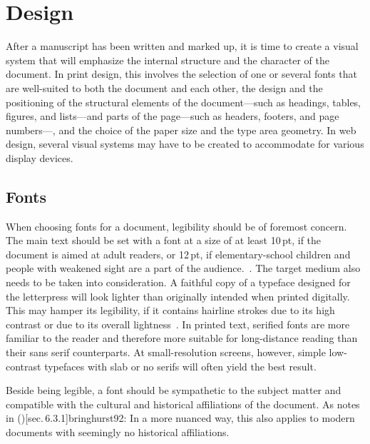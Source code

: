 \chapter{Design}
After a manuscript has been written and marked up, it is time to create a visual
system that will emphasize the internal structure and the character of the
document. In print design, this involves the selection of one or several fonts
that are well-suited to both the document and each other, the design and the
positioning of the structural elements of the document---such as headings,
tables, figures, and lists---and parts of the page---such as headers, footers,
and page numbers---, and the choice of the paper size and the type area
geometry. In web design, several visual systems may have to be created to
accommodate for various display devices.

\section{Fonts}
When choosing fonts for a document, legibility should be of foremost concern.
The main text should be set with a font at a size of at least 10\,pt, if the
document is aimed at adult readers, or 12\,pt, if elementary-school children and
people with weakened sight are a part of the
audience.~\cite[para.\,13--15]{kapr99}. The target medium also needs to be taken
into consideration. A faithful copy of a typeface designed for the letterpress
will look lighter than originally intended when printed digitally. This may
hamper its legibility, if it contains hairline strokes due to its high contrast
or due to its overall lightness~\cite[sec.~6.1.2]{bringhurst92}. In printed
text, serified fonts are more familiar to the reader and therefore more suitable
for long-distance reading than their sans serif counterparts. At
small-resolution screens, however, simple low-contrast typefaces with slab or no
serifs will often yield the best result.

Beside being legible, a font should be sympathetic to the subject matter and
compatible with the cultural and historical affiliations of the document. As
 notes in \citework*()[sec.\,6.3.1]{bringhurst92}:
 In a more nuanced way, this also applies to modern
documents with seemingly no historical affiliations.

